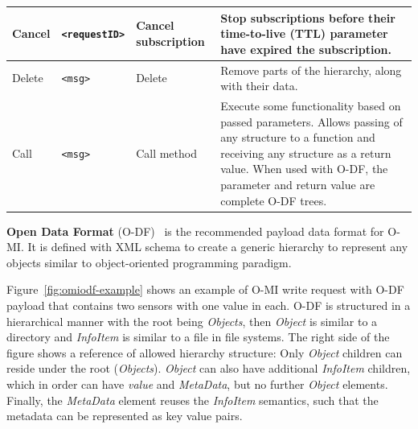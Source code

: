 \begin{table}[H]
\begin{tabular}{|p{}|p{}|p{}|p{}|}
    Cancel & \texttt{<requestID>} & Cancel \newline subscription & Stop subscriptions before their time-to-live (TTL) parameter have expired the subscription. \\ \hline
    Delete & \texttt{<msg>} & Delete & Remove parts of the hierarchy, along with their data. \\ \hline
    Call & \texttt{<msg>} & Call method & Execute some functionality based on passed parameters. Allows passing of any structure to a function and receiving any structure as a return value. When used with O-DF, the parameter and return value are complete O-DF trees. \\ \hline
  \end{tabular}
\end{table}
\egroup


\textbf{Open Data Format} (O-DF)~\cite{o-df} is the recommended payload data format for O-MI. It is defined with XML schema to create a generic hierarchy to represent any objects similar to object-oriented programming paradigm.

Figure~\ref{fig:omiodf-example} shows an example of O-MI write request with O-DF payload that contains two sensors with one value in each. O-DF is structured in a hierarchical manner with the root being \emph{Objects}, then \emph{Object} is similar to a directory and \emph{InfoItem} is similar to a file in file systems. The right side of the figure shows a reference of allowed hierarchy structure: Only \emph{Object} children can reside under the root (\emph{Objects}). \emph{Object} can also have additional \emph{InfoItem} children, which in order can have \emph{value} and \emph{MetaData}, but no further \emph{Object} elements. Finally, the \emph{MetaData} element reuses the \emph{InfoItem} semantics, such that the metadata can be represented as key value pairs.

